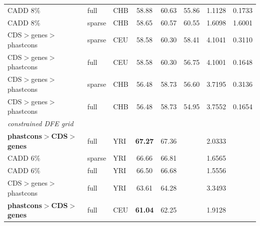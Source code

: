 \documentclass[11pt]{article}
\begin{document}
\begin{table}
\begin{tabular}{lll|crr|cc}
               CADD 8\% &              full &          CHB &                        58.88 &             60.63 &            55.86 &                                 1.1128 &                                0.1733 \\
               CADD 8\% &            sparse &          CHB &                        58.65 &             60.57 &            60.55 &                                 1.6098 &                                1.6001 \\
CDS$>$genes$>$phastcons &            sparse &          CEU &                        58.58 &             60.30 &            58.41 &                                 4.1041 &                                0.3110 \\
CDS$>$genes$>$phastcons &              full &          CEU &                        58.58 &             60.30 &            56.75 &                                 4.1001 &                                0.1648 \\
CDS$>$genes$>$phastcons &            sparse &          CHB &                        56.48 &             58.73 &            56.60 &                                 3.7195 &                                0.3136 \\
CDS$>$genes$>$phastcons &              full &          CHB &                        56.48 &             58.73 &            54.95 &                                 3.7552 &                                0.1654 \\
\hline
\hline
\emph{constrained DFE grid} & & & & & & \\
\hline
\textbf{phastcons$>$CDS$>$genes}  &              full &          YRI &               \textbf{67.27} &             67.36 &             &                                 2.0333 &                                \\
               CADD 6\%  &            sparse &          YRI &                        66.66 &             66.81 &             &                                 1.6565 &                                \\
               CADD 6\%  &              full &          YRI &                        66.50 &             66.68 &             &                                 1.5556 &                                \\
CDS$>$genes$>$phastcons  &              full &          YRI &                        63.61 &             64.28 &             &                                 3.3493 &                                \\
\textbf{phastcons$>$CDS$>$genes}  &              full &          CEU &               \textbf{61.04} &             62.25 &             &                                 1.9128 &                                \\

\end{tabular}
\end{table}
\end{document}
